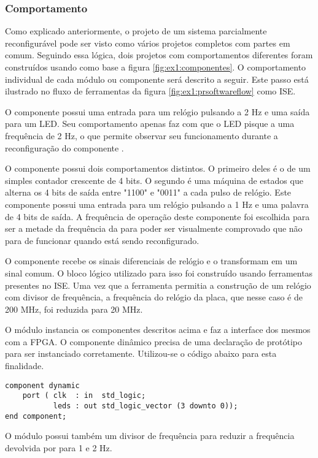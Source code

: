 \documentclass[11pt,a4paper,oneside]{book}
\begin{document}
\subsubsection{Comportamento}
Como explicado anteriormente, o projeto de um sistema parcialmente reconfigurável pode ser visto como vários projetos completos com partes em comum.
Seguindo essa lógica, dois projetos com comportamentos diferentes foram construídos usando como base a figura \ref{fig:ex1:componentes}.
O comportamento individual de cada módulo ou componente será descrito a seguir.
Este passo está ilustrado no fluxo de ferramentas da figura \ref{fig:ex1:prsoftwareflow} como ISE.

O componente  possui uma entrada para um relógio pulsando a 2 Hz e uma saída para um LED.
Seu comportamento apenas faz com que o LED pisque a uma frequência de 2 Hz, o que permite observar seu funcionamento durante a reconfiguração do componente .

O componente  possui dois comportamentos distintos.
O primeiro deles é o de um simples contador crescente de 4 bits.
O segundo é uma máquina de estados que alterna os 4 bits de saída entre "1100" e "0011" a cada pulso de relógio.
Este componente possui uma entrada para um relógio pulsando a 1 Hz e uma palavra de 4 bits de saída.
A frequência de operação deste componente foi escolhida para ser a metade da frequência da  para poder ser visualmente comprovado que  não para de funcionar quando  está sendo reconfigurado.

O componente  recebe os sinais diferenciais de relógio e o transformam em um sinal comum.
O bloco lógico utilizado para isso foi construído usando ferramentas presentes no ISE.
Uma vez que a ferramenta permitia a construção de um relógio com divisor de frequência, a frequência do relógio da placa, que nesse caso é de 200 MHz, foi reduzida para 20 MHz.

O módulo  instancia os componentes descritos acima e faz a interface dos mesmos com a FPGA.
O componente dinâmico precisa de uma declaração de protótipo para ser instanciado corretamente.
Utilizou-se o código abaixo para esta finalidade.
\begin{lstlisting}[style=customVHDL]
component dynamic
    port ( clk  : in  std_logic;
           leds : out std_logic_vector (3 downto 0));
end component;
\end{lstlisting}
O módulo  possui também um divisor de frequência para reduzir a frequência devolvida por  para 1 e 2 Hz.
\end{document}
